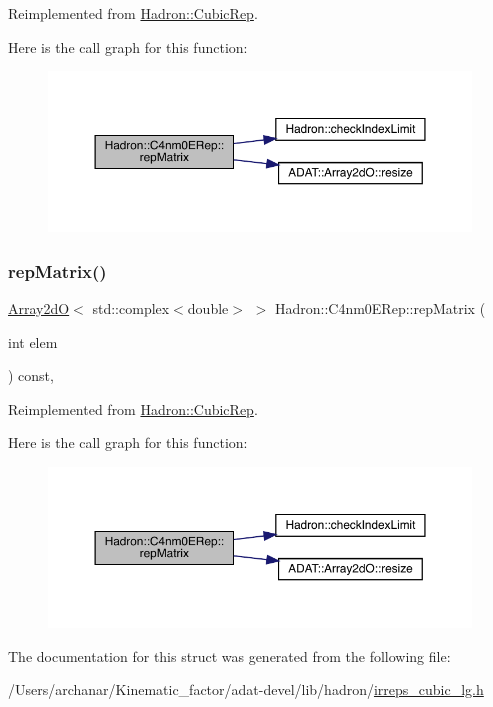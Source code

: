 Reimplemented from \mbox{\hyperlink{structHadron_1_1CubicRep_ac5d7e9e6f4ab1158b5fce3e4ad9e8005}{Hadron\+::\+Cubic\+Rep}}.

Here is the call graph for this function\+:
\nopagebreak
\begin{figure}[H]
\begin{center}
\leavevmode
\includegraphics[width=350pt]{d3/d8a/structHadron_1_1C4nm0ERep_aa9353c0f2a226224911c51db6f647ccf_cgraph}
\end{center}
\end{figure}
\mbox{\label{structHadron_1_1C4nm0ERep_aa9353c0f2a226224911c51db6f647ccf}} 
\subsubsection{\texorpdfstring{repMatrix()}{repMatrix()}\hspace{0.1cm}{\footnotesize\ttfamily [3/3]}}
{\footnotesize\ttfamily \mbox{\hyperlink{classADAT_1_1Array2dO}{Array2dO}}$<$ std\+::complex$<$double$>$ $>$ Hadron\+::\+C4nm0\+E\+Rep\+::rep\+Matrix (\begin{DoxyParamCaption}\item[{int}]{elem }\end{DoxyParamCaption}) const\hspace{0.3cm}{\ttfamily [inline]}, {\ttfamily [virtual]}}



Reimplemented from \mbox{\hyperlink{structHadron_1_1CubicRep_ac5d7e9e6f4ab1158b5fce3e4ad9e8005}{Hadron\+::\+Cubic\+Rep}}.

Here is the call graph for this function\+:
\nopagebreak
\begin{figure}[H]
\begin{center}
\leavevmode
\includegraphics[width=350pt]{d3/d8a/structHadron_1_1C4nm0ERep_aa9353c0f2a226224911c51db6f647ccf_cgraph}
\end{center}
\end{figure}


The documentation for this struct was generated from the following file\+:\begin{DoxyCompactItemize}
\item 
/\+Users/archanar/\+Kinematic\+\_\+factor/adat-\/devel/lib/hadron/\mbox{\hyperlink{adat-devel_2lib_2hadron_2irreps__cubic__lg_8h}{irreps\+\_\+cubic\+\_\+lg.\+h}}\end{DoxyCompactItemize}
